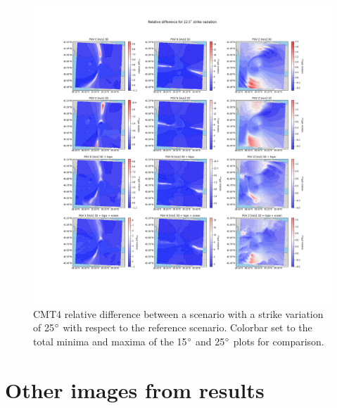 \documentclass[../Text/00main.tex]{subfiles}
\begin{document}
\begin{figure}[!h]
    \centering
    \includegraphics[width=1.2\linewidth]{images_results/strike_variation_epsilon25_sc4.png}
    \caption{CMT4 relative difference between a scenario with a strike variation of 25$\degree$ with respect to the reference scenario. Colorbar set to the total minima and maxima of the 15$\degree$ and 25$\degree$ plots for comparison.}
    \label{fig:ref_eps25-2}
\end{figure}





\section{Other images from results}
\end{document}
